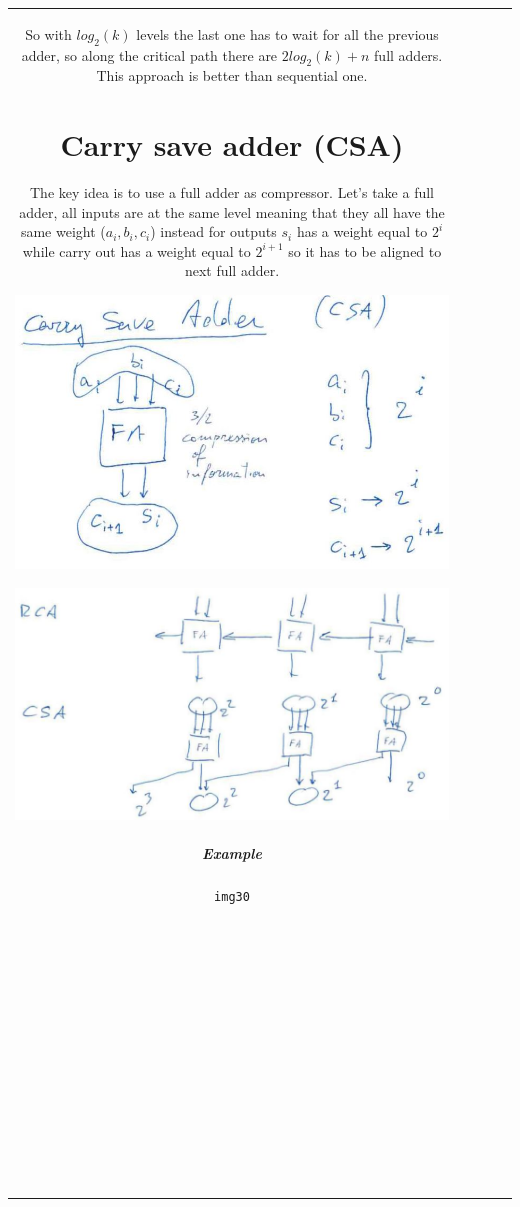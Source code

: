 \begin{center}
\begin{tabular}{|c|c|c|c|c|}
So with $log_2( k)$ levels the last one has to wait for all the previous adder, so along the critical path there are $2log_2 (k)+n$ full adders. This approach is better than sequential one.

\section{Carry save adder (CSA)}

The key idea is to use a full adder as compressor. Let's take a full adder, all inputs are at the same level meaning that they all have the same weight ($a_i,b_i, c_i$) instead for outputs $s_i$ has a weight equal to $2^i$ while carry out has a weight equal to $2^{i+1}$ so it has to be aligned to next full adder.

\begin{center}
  \includegraphics[width=0.7\linewidth]{img/img2/26}
\end{center}
\begin{center}
  \includegraphics[width=0.7\linewidth]{img/img2/27}
\end{center}

\subparagraph{Example}
\begin{verbatim}
img30















\end{verbatim}
\end{tabular}
\end{center}
